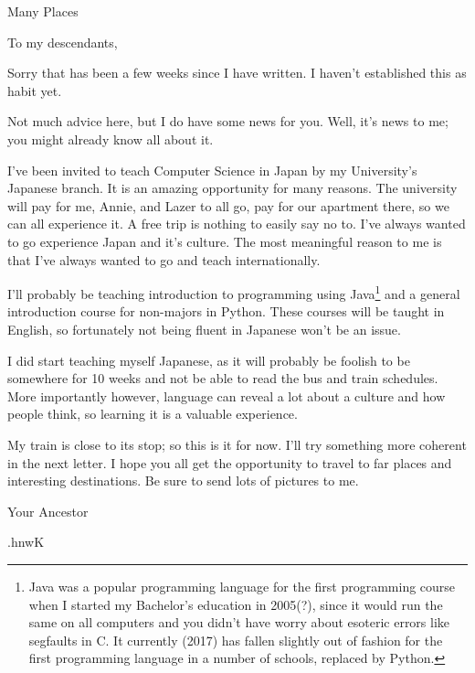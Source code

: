 \documentclass[]{letter}
\begin{document}
\date{October 27, 2017}
\begin{letter}{Many Places}
\address{Philadelphia,\\ L Train}

\opening{To my descendants,}

Sorry that has been a few weeks since I have written.
I haven't established this as habit yet.

Not much advice here, but I do have some news for you.  
Well, it's news to me; you might already know all about it.

I've been invited to teach Computer Science in Japan by my University's Japanese branch.
It is an amazing opportunity for many reasons.
The university will pay for me, Annie, and Lazer to all go, pay for our apartment there, so we can all experience it.
A free trip is nothing to easily say no to.
I've always wanted to go experience Japan and it's culture.
The most meaningful reason to me is that I've always wanted to go and teach internationally.

I'll probably be teaching introduction to programming using Java\footnote{Java was a popular programming language for the first programming course when I started my Bachelor's education in 2005(?), since it would run the same on all computers and you didn't have worry about esoteric errors like segfaults in C.  It currently (2017) has fallen slightly out of fashion for the first programming language in a number of schools, replaced by Python.} and a general introduction course for non-majors in Python.
These courses will be taught in English, so fortunately not being fluent in Japanese won't be an issue.

I did start teaching myself Japanese, as it will probably be foolish to be somewhere for 10 weeks and not be able to read the bus and train schedules.
More importantly however, language can reveal a lot about a culture and how people think, so learning it is a valuable experience.

My train is close to its stop; so this is it for now.
I'll try something more coherent in the next letter.
I hope you all get the opportunity to travel to far places and interesting destinations.
Be sure to send lots of pictures to me.

\signature{Professor Andrew Benjamin Rosen}

\closing{Your Ancestor }



\begin{cjhebrew}
	.hnwK
\end{cjhebrew}
\end{letter}
\end{document}
